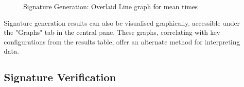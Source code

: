 \documentclass[]{final_report}
\theoremstyle{definition}
\begin{document}
\begin{figure}[H]
\begin{minipage}{0.7\textwidth}
        \caption{Signature Generation: Overlaid Line graph for mean times}
        \label{fig:image2}
    \end{minipage}
\end{figure}

Signature generation results can also be visualised graphically, accessible under the "Graphs" tab in the central pane. These graphs, correlating with key configurations from the results table, offer an alternate method for interpreting data.

\subsection{Signature Verification}
\end{document}
